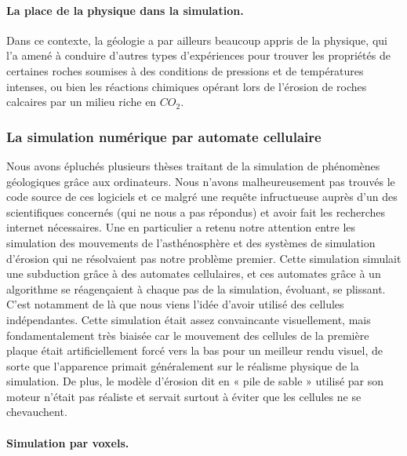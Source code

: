 \documentclass[a4paper,11pt]{article}
\begin{document}
\paragraph{La place de la physique dans la simulation.}

Dans ce contexte, la géologie a par ailleurs beaucoup appris de la physique, qui l'a amené à conduire d'autres types d'expériences pour trouver les propriétés de certaines roches soumises à des conditions de pressions et de températures intenses, ou bien les réactions chimiques opérant lors de l'érosion de roches calcaires par un milieu riche en $CO_2$.

\subsubsection{La simulation numérique par automate cellulaire}

Nous avons épluchés plusieurs thèses traitant de la simulation de phénomènes géologiques grâce aux ordinateurs.
Nous n'avons malheureusement pas trouvés le code source de ces logiciels et ce malgré une requête infructueuse auprès d'un des scientifiques concernés (qui ne nous a pas répondus) et avoir fait les recherches internet nécessaires.
Une en particulier a retenu notre attention entre les simulation des mouvements de l’asthénosphère et des systèmes de simulation d'érosion qui ne résolvaient pas notre problème premier.
Cette simulation simulait une subduction grâce à des automates cellulaires, et ces automates grâce à un algorithme se réagençaient à chaque pas de la simulation, évoluant, se plissant.
C'est notamment de là que nous viens l'idée d'avoir utilisé des cellules indépendantes.
Cette simulation était assez convaincante visuellement, mais fondamentalement très biaisée car le mouvement des cellules de la première plaque était artificiellement forcé vers la bas pour un meilleur rendu visuel, de sorte que l'apparence primait généralement sur le réalisme physique de la simulation.
De plus, le modèle d'érosion dit en « pile de sable » utilisé par son moteur n'était pas réaliste et servait surtout à éviter que les cellules ne se chevauchent.

\paragraph{Simulation par voxels.}
\end{document}
